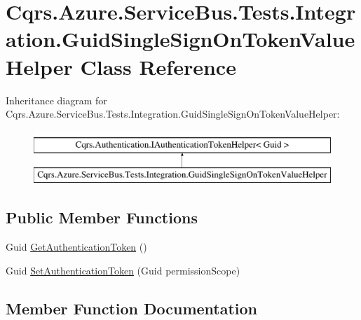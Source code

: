 \hypertarget{classCqrs_1_1Azure_1_1ServiceBus_1_1Tests_1_1Integration_1_1GuidSingleSignOnTokenValueHelper}{}\section{Cqrs.\+Azure.\+Service\+Bus.\+Tests.\+Integration.\+Guid\+Single\+Sign\+On\+Token\+Value\+Helper Class Reference}
\label{classCqrs_1_1Azure_1_1ServiceBus_1_1Tests_1_1Integration_1_1GuidSingleSignOnTokenValueHelper}
Inheritance diagram for Cqrs.\+Azure.\+Service\+Bus.\+Tests.\+Integration.\+Guid\+Single\+Sign\+On\+Token\+Value\+Helper\+:\begin{figure}[H]
\begin{center}
\leavevmode
\includegraphics[height=2.000000cm]{classCqrs_1_1Azure_1_1ServiceBus_1_1Tests_1_1Integration_1_1GuidSingleSignOnTokenValueHelper}
\end{center}
\end{figure}
\subsection*{Public Member Functions}
\begin{DoxyCompactItemize}
\item 
Guid \hyperlink{classCqrs_1_1Azure_1_1ServiceBus_1_1Tests_1_1Integration_1_1GuidSingleSignOnTokenValueHelper_a4e9fb05fb52724d4c4506d6b02091c49}{Get\+Authentication\+Token} ()
\item 
Guid \hyperlink{classCqrs_1_1Azure_1_1ServiceBus_1_1Tests_1_1Integration_1_1GuidSingleSignOnTokenValueHelper_a9f4707f1521d26a2d2123592be87e74c}{Set\+Authentication\+Token} (Guid permission\+Scope)
\end{DoxyCompactItemize}


\subsection{Member Function Documentation}
\mbox{\label{classCqrs_1_1Azure_1_1ServiceBus_1_1Tests_1_1Integration_1_1GuidSingleSignOnTokenValueHelper_a4e9fb05fb52724d4c4506d6b02091c49}} 
